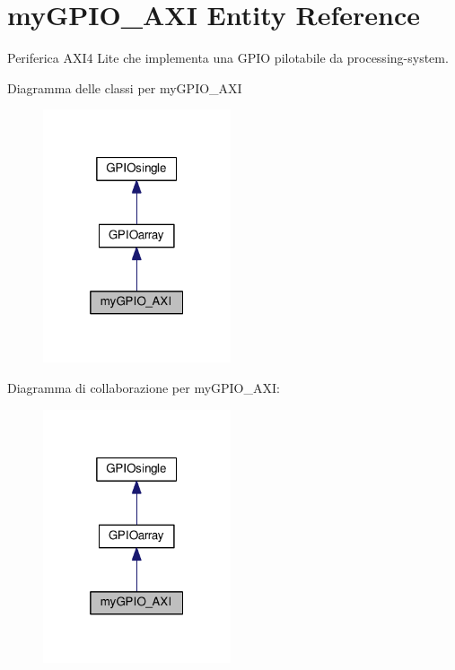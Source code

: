 \hypertarget{classmy_g_p_i_o___a_x_i}{\section{my\+G\+P\+I\+O\+\_\+\+A\+X\+I Entity Reference}
\label{classmy_g_p_i_o___a_x_i}
}


Periferica A\+X\+I4 Lite che implementa una G\+P\+I\+O pilotabile da processing-\/system.  




Diagramma delle classi per my\+G\+P\+I\+O\+\_\+\+A\+X\+I\nopagebreak
\begin{figure}[H]
\begin{center}
\leavevmode
\includegraphics[width=157pt]{classmy_g_p_i_o___a_x_i__inherit__graph}
\end{center}
\end{figure}


Diagramma di collaborazione per my\+G\+P\+I\+O\+\_\+\+A\+X\+I\+:\nopagebreak
\begin{figure}[H]
\begin{center}
\leavevmode
\includegraphics[width=157pt]{classmy_g_p_i_o___a_x_i__coll__graph}
\end{center}
\end{figure}
